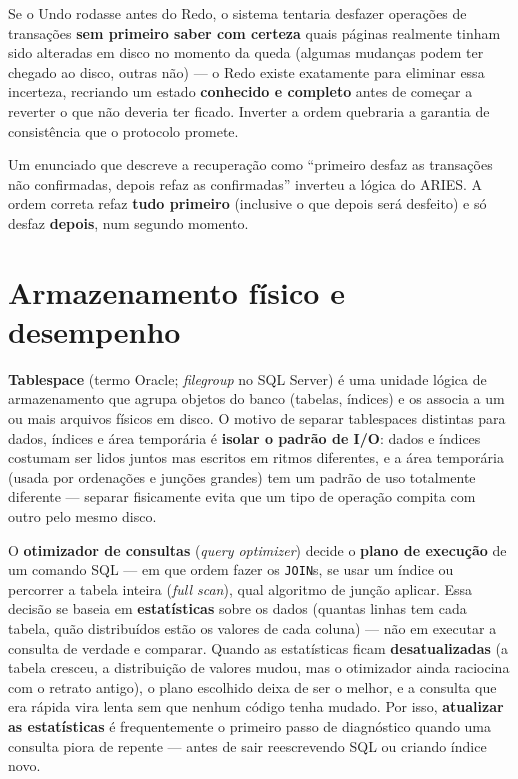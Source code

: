 \begin{exemplo}
Se o Undo rodasse antes do Redo, o sistema tentaria desfazer operações de
transações \textbf{sem primeiro saber com certeza} quais páginas realmente
tinham sido alteradas em disco no momento da queda (algumas mudanças
podem ter chegado ao disco, outras não) --- o Redo existe exatamente para
eliminar essa incerteza, recriando um estado \textbf{conhecido e completo}
antes de começar a reverter o que não deveria ter ficado. Inverter a ordem
quebraria a garantia de consistência que o protocolo promete.
\end{exemplo}

\begin{cuidado}
Um enunciado que descreve a recuperação como “primeiro desfaz as
transações não confirmadas, depois refaz as confirmadas” inverteu a lógica
do ARIES. A ordem correta refaz \textbf{tudo primeiro} (inclusive o que
depois será desfeito) e só desfaz \textbf{depois}, num segundo momento.
\end{cuidado}

\section{Armazenamento físico e desempenho}

\begin{conceito}
\textbf{Tablespace} (termo Oracle; \textit{filegroup} no SQL Server) é uma
unidade lógica de armazenamento que agrupa objetos do banco (tabelas,
índices) e os associa a um ou mais arquivos físicos em disco. O motivo de
separar tablespaces distintas para dados, índices e área temporária é
\textbf{isolar o padrão de I/O}: dados e índices costumam ser lidos juntos
mas escritos em ritmos diferentes, e a área temporária (usada por
ordenações e junções grandes) tem um padrão de uso totalmente diferente
--- separar fisicamente evita que um tipo de operação compita com outro
pelo mesmo disco.
\end{conceito}

\begin{conceito}
O \textbf{otimizador de consultas} (\textit{query optimizer}) decide o
\textbf{plano de execução} de um comando SQL --- em que ordem fazer os
\texttt{JOIN}s, se usar um índice ou percorrer a tabela inteira
(\textit{full scan}), qual algoritmo de junção aplicar. Essa decisão se
baseia em \textbf{estatísticas} sobre os dados (quantas linhas tem cada
tabela, quão distribuídos estão os valores de cada coluna) --- não em
executar a consulta de verdade e comparar. Quando as estatísticas ficam
\textbf{desatualizadas} (a tabela cresceu, a distribuição de valores mudou,
mas o otimizador ainda raciocina com o retrato antigo), o plano escolhido
deixa de ser o melhor, e a consulta que era rápida vira lenta sem que
nenhum código tenha mudado. Por isso, \textbf{atualizar as estatísticas} é
frequentemente o primeiro passo de diagnóstico quando uma consulta piora de
repente --- antes de sair reescrevendo SQL ou criando índice novo.
\end{conceito}

